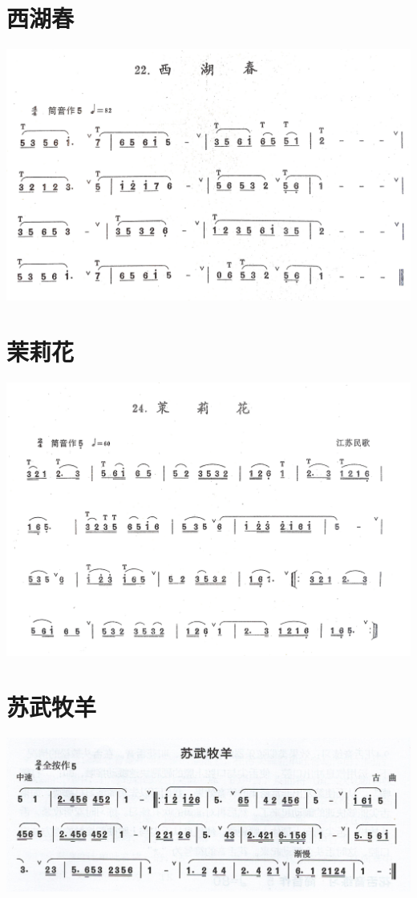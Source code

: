 \documentclass[cn,pad,chinesefont=nofont,twocol]{elegantbook}
\begin{document}
\section{西湖春}
    \includegraphics[width=\textwidth]{dongxiao/20200711-西湖春.jpg}
\section{茉莉花}
    \includegraphics[width=\textwidth]{dongxiao/20200711-茉莉花.jpg}
\section{苏武牧羊}
    \includegraphics[width=\textwidth]{dongxiao/20200711-苏武牧羊.jpeg}
\end{document}
